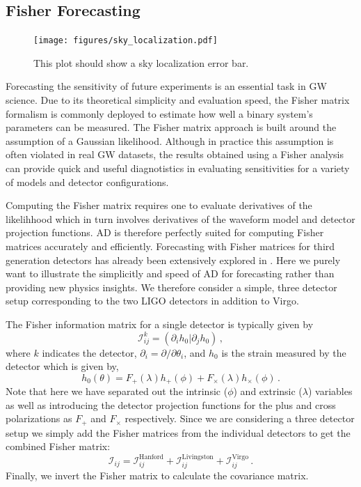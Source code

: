 \documentclass[twocolumn]{aastex631}
\begin{document}
\subsection{Fisher Forecasting}
\label{subsec:fisher}

\begin{figure}[t!]
    \centering
    \texttt{[image: figures/sky\_localization.pdf]}
    \caption{
        This plot should show a sky localization error bar.
    }
    \label{fig:sky_localization}
\end{figure}

Forecasting the sensitivity of future experiments is an essential task in GW science.
Due to its theoretical simplicity and evaluation speed, the Fisher matrix formalism is commonly deployed to estimate how well a binary system's parameters can be measured.
The Fisher matrix approach is built around the assumption of a Gaussian likelihood.
Although in practice this assumption is often violated in real GW datasets, the results obtained using a Fisher analysis can provide quick and useful diagnotistics in evaluating sensitivities for a variety of models and detector configurations.

Computing the Fisher matrix requires one to evaluate derivatives of the likelihhood which in turn involves derivatives of the waveform model and detector projection functions.
AD is therefore perfectly suited for computing Fisher matrices accurately and efficiently. 
Forecasting with Fisher matrices for third generation detectors has already been extensively explored in \citep{Iacovelli:2022bbs, Iacovelli:2022mbg}.
Here we purely want to illustrate the simplicitly and speed of AD for forecasting rather than providing new physics insights.
We therefore consider a simple, three detector setup corresponding to the two LIGO detectors in addition to Virgo.

The Fisher information matrix for a single detector is typically given by 
\begin{equation}
    \mathcal{I}^{k}_{ij} = (\partial_i h_0 | \partial_j h_0) \, ,
\end{equation}
where $k$ indicates the detector, $\partial_i = \partial/\partial \theta_i$, and $h_0$ is the strain measured by the detector which is given by,
\begin{equation}
    h_0(\theta) = F_+(\lambda) h_{+}(\phi) + F_\times(\lambda) h_{\times}(\phi) \, .
\end{equation}
Note that here we have separated out the intrinsic ($\phi$) and extrinsic ($\lambda$) variables as well as introducing the detector projection functions for the plus and cross polarizations as $F_+$ and $F_\times$ respectively.
Since we are considering a three detector setup we simply add the Fisher matrices from the individual detectors to get the combined Fisher matrix:
\begin{equation}
    \mathcal{I}_{ij} =  \mathcal{I}^{\mathrm{Hanford}}_{ij} + \mathcal{I}^{\mathrm{Livingston}}_{ij} + \mathcal{I}^{\mathrm{Virgo}}_{ij}   \, .
\end{equation}
Finally, we invert the Fisher matrix to calculate the covariance matrix.
\end{document}
